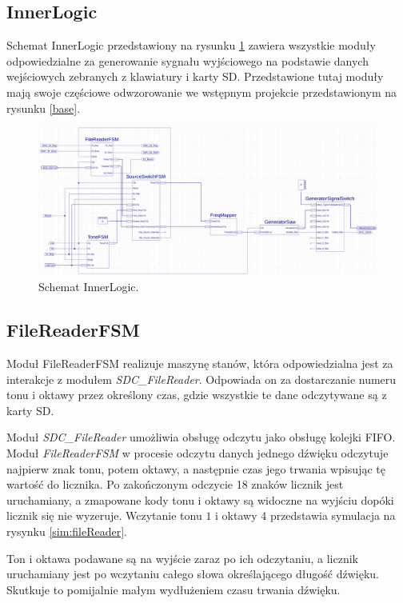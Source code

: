 \documentclass[12pt]{article}
\begin{document}
\subsection{InnerLogic}

Schemat InnerLogic przedstawiony na rysunku \ref{sch:inner} zawiera wszystkie moduły odpowiedzialne za generowanie sygnału wyjściowego na podstawie danych wejściowych zebranych z klawiatury i karty SD. Przedstawione tutaj moduły mają swoje częściowe odwzorowanie we wstępnym projekcie przedstawionym na rysunku \ref{base}.

\begin{figure}[h]
  \centering
  \includegraphics[width=\linewidth]{images/inner}
  \caption{Schemat InnerLogic.}
  \label{sch:inner}
\end{figure}

\subsection{FileReaderFSM}

Moduł FileReaderFSM realizuje maszynę stanów, która odpowiedzialna jest za interakcje z modułem \textit{SDC\_FileReader}. Odpowiada on za dostarczanie numeru tonu i oktawy przez określony czas, gdzie wszystkie te dane odczytywane są z karty SD.

Moduł \textit{SDC\_FileReader} umożliwia obsługę odczytu jako obsługę kolejki FIFO. Moduł \textit{FileReaderFSM} w procesie odczytu danych jednego dźwięku odczytuje najpierw znak tonu, potem oktawy, a następnie czas jego trwania wpisując tę wartość do licznika. Po zakończonym odczycie 18 znaków licznik jest uruchamiany, a zmapowane kody tonu i oktawy są widoczne na wyjściu dopóki licznik się nie wyzeruje. Wczytanie tonu $1$ i oktawy $4$ przedstawia symulacja na rysynku \ref{sim:fileReader}.

Ton i oktawa podawane są na wyjście zaraz po ich odczytaniu, a licznik uruchamiany jest po wczytaniu całego słowa określającego długość dźwięku. Skutkuje to pomijalnie małym wydłużeniem czasu trwania dźwięku.
\end{document}
